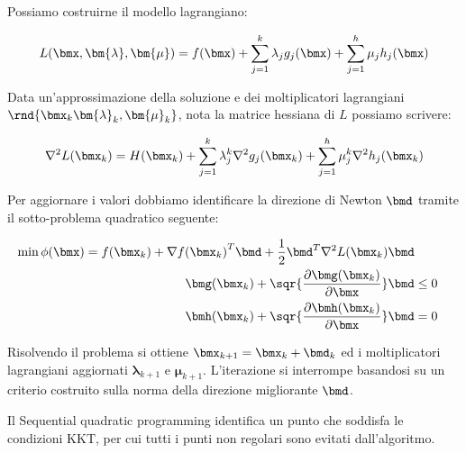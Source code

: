 \documentclass[\main/main.tex]{subfiles}
\begin{document}
Possiamo costruirne il modello lagrangiano:

\[
    L(\bmx, \bm{\lambda}, \bm{\mu}) = f(\bmx) + \sum_{j=1}^k \lambda_j g_j(\bmx) + \sum_{j=1}^h \mu_j h_j(\bmx)
\]

Data un'approssimazione della soluzione e dei moltiplicatori lagrangiani \(\rnd{\bmx_k \bm{\lambda}_k, \bm{\mu}_k}\), nota la matrice hessiana di \(L\) possiamo scrivere:

\[
    \nabla^2 L(\bmx_k) = H(\bmx_k) + \sum_{j=1}^k \lambda_j^k \nabla^2g_j(\bmx_k) + \sum_{j=1}^h \mu_j^k \nabla^2h_j(\bmx_k)
\]

Per aggiornare i valori dobbiamo identificare la direzione di Newton \(\bmd \) tramite il sotto-problema quadratico seguente:

\begin{align*}
    \min \phi(\bmx) = f(\bmx_k) + \nabla {f(\bmx_k)}^T \bmd+ \frac{1}{2}\bmd^T\nabla^2L(\bmx_k)\bmd \\
    \bmg(\bmx_k) + \sqr{\frac{\partial \bmg(\bmx_k)}{\partial \bmx}}\bmd &\leq 0\\
    \bmh(\bmx_k) + \sqr{\frac{\partial \bmh(\bmx_k)}{\partial \bmx}}\bmd &= 0\\
\end{align*}

Risolvendo il problema si ottiene \(\bmx_{k+1} = \bmx_k + \bmd_k\) ed i moltiplicatori lagrangiani aggiornati \(\bm{\lambda}_{k+1}\) e \(\bm{\mu}_{k+1}\). L'iterazione si interrompe basandosi su un criterio costruito sulla norma della direzione migliorante \(\bmd \).

Il Sequential quadratic programming identifica un punto che soddisfa le condizioni KKT, per cui tutti i punti non regolari sono evitati dall'algoritmo.
\end{document}

